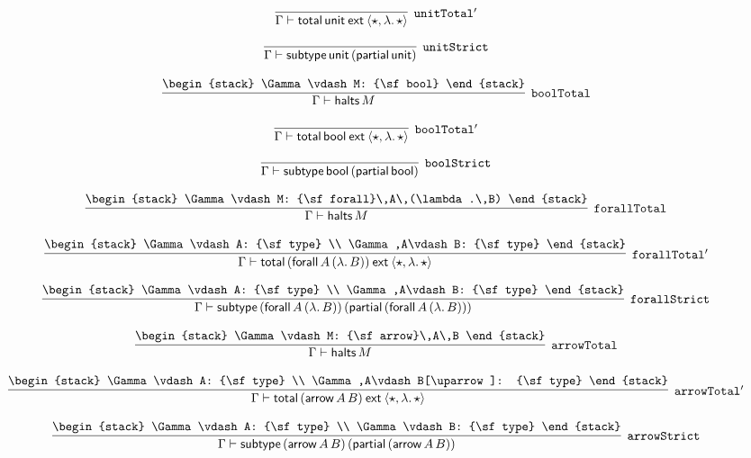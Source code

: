 \[
\infer[{\tt unitTotal'}]{\Gamma \vdash {\sf total}\,{\sf unit}\:{\sf ext}\:\langle \star ,\lambda .\,\star \rangle }{}
\]

\[
\infer[{\tt unitStrict}]{\Gamma \vdash {\sf subtype}\,{\sf unit}\,({\sf partial}\,{\sf unit})}{}
\]

\[
\infer[{\tt boolTotal}]{\Gamma \vdash {\sf halts}\,M}{
\begin{stack}
\Gamma \vdash M: {\sf bool}
\end{stack}}
\]

\[
\infer[{\tt boolTotal'}]{\Gamma \vdash {\sf total}\,{\sf bool}\:{\sf ext}\:\langle \star ,\lambda .\,\star \rangle }{}
\]

\[
\infer[{\tt boolStrict}]{\Gamma \vdash {\sf subtype}\,{\sf bool}\,({\sf partial}\,{\sf bool})}{}
\]

\[
\infer[{\tt forallTotal}]{\Gamma \vdash {\sf halts}\,M}{
\begin{stack}
\Gamma \vdash M: {\sf forall}\,A\,(\lambda .\,B)
\end{stack}}
\]

\[
\infer[{\tt forallTotal'}]{\Gamma \vdash {\sf total}\,({\sf forall}\,A\,(\lambda .\,B))\:{\sf ext}\:\langle \star ,\lambda .\,\star \rangle }{
\begin{stack}
\Gamma \vdash A: {\sf type}
\\
\Gamma ,A\vdash B: {\sf type}
\end{stack}}
\]

\[
\infer[{\tt forallStrict}]{\Gamma \vdash {\sf subtype}\,({\sf forall}\,A\,(\lambda .\,B))\,({\sf partial}\,({\sf forall}\,A\,(\lambda .\,B)))}{
\begin{stack}
\Gamma \vdash A: {\sf type}
\\
\Gamma ,A\vdash B: {\sf type}
\end{stack}}
\]

\[
\infer[{\tt arrowTotal}]{\Gamma \vdash {\sf halts}\,M}{
\begin{stack}
\Gamma \vdash M: {\sf arrow}\,A\,B
\end{stack}}
\]

\[
\infer[{\tt arrowTotal'}]{\Gamma \vdash {\sf total}\,({\sf arrow}\,A\,B)\:{\sf ext}\:\langle \star ,\lambda .\,\star \rangle }{
\begin{stack}
\Gamma \vdash A: {\sf type}
\\
\Gamma ,A\vdash B[\uparrow ]: {\sf type}
\end{stack}}
\]

\[
\infer[{\tt arrowStrict}]{\Gamma \vdash {\sf subtype}\,({\sf arrow}\,A\,B)\,({\sf partial}\,({\sf arrow}\,A\,B))}{
\begin{stack}
\Gamma \vdash A: {\sf type}
\\
\Gamma \vdash B: {\sf type}
\end{stack}}
\]

